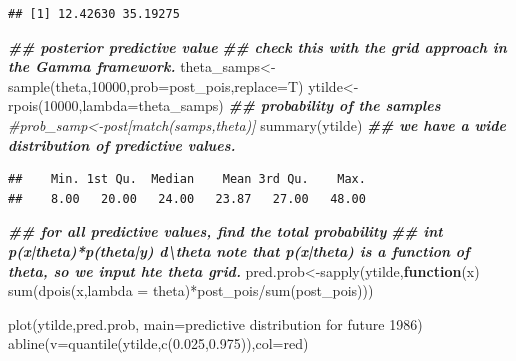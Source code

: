 \documentclass[
]{book}
\newenvironment{Shaded}{\begin{snugshade}}{\end{snugshade}}
\newcommand{\AttributeTok}[1]{\textcolor[rgb]{0.77,0.63,0.00}{#1}}
\newcommand{\CommentTok}[1]{\textcolor[rgb]{0.56,0.35,0.01}{\textit{#1}}}
\newcommand{\ControlFlowTok}[1]{\textcolor[rgb]{0.13,0.29,0.53}{\textbf{#1}}}
\newcommand{\DecValTok}[1]{\textcolor[rgb]{0.00,0.00,0.81}{#1}}
\newcommand{\DocumentationTok}[1]{\textcolor[rgb]{0.56,0.35,0.01}{\textbf{\textit{#1}}}}
\newcommand{\FloatTok}[1]{\textcolor[rgb]{0.00,0.00,0.81}{#1}}
\newcommand{\FunctionTok}[1]{\textcolor[rgb]{0.00,0.00,0.00}{#1}}
\newcommand{\NormalTok}[1]{#1}
\newcommand{\OtherTok}[1]{\textcolor[rgb]{0.56,0.35,0.01}{#1}}
\newcommand{\SpecialCharTok}[1]{\textcolor[rgb]{0.00,0.00,0.00}{#1}}
\newcommand{\StringTok}[1]{\textcolor[rgb]{0.31,0.60,0.02}{#1}}
\theoremstyle{definition}
\theoremstyle{definition}
\theoremstyle{definition}
\theoremstyle{definition}
\theoremstyle{remark}
\begin{document}
\begin{verbatim}
## [1] 12.42630 35.19275
\end{verbatim}

\begin{Shaded}
\begin{Highlighting}[]
\DocumentationTok{\#\# posterior predictive value}
   \DocumentationTok{\#\# check this with the grid approach in the Gamma framework.  }
\NormalTok{  theta\_samps}\OtherTok{\textless{}{-}}\FunctionTok{sample}\NormalTok{(theta,}\DecValTok{10000}\NormalTok{,}\AttributeTok{prob=}\NormalTok{post\_pois,}\AttributeTok{replace=}\NormalTok{T)}
\NormalTok{   ytilde}\OtherTok{\textless{}{-}}\FunctionTok{rpois}\NormalTok{(}\DecValTok{10000}\NormalTok{,}\AttributeTok{lambda=}\NormalTok{theta\_samps) }
 \DocumentationTok{\#\# probability of the samples }
 \CommentTok{\#prob\_samp\textless{}{-}post[match(samps,theta)]}
  \FunctionTok{summary}\NormalTok{(ytilde) }\DocumentationTok{\#\# we have a wide distribution of predictive values.}
\end{Highlighting}
\end{Shaded}

\begin{verbatim}
##    Min. 1st Qu.  Median    Mean 3rd Qu.    Max. 
##    8.00   20.00   24.00   23.87   27.00   48.00
\end{verbatim}

\begin{Shaded}
\begin{Highlighting}[]
\DocumentationTok{\#\# for all predictive values,  find the total probability  }
   \DocumentationTok{\#\# int p(x|theta)*p(theta|y) d\textbackslash{}theta  note that p(x|theta) is a function of theta, so we input hte theta grid.}
\NormalTok{ pred.prob}\OtherTok{\textless{}{-}}\FunctionTok{sapply}\NormalTok{(ytilde,}\ControlFlowTok{function}\NormalTok{(x) }\FunctionTok{sum}\NormalTok{(}\FunctionTok{dpois}\NormalTok{(x,}\AttributeTok{lambda =}\NormalTok{ theta)}\SpecialCharTok{*}\NormalTok{post\_pois}\SpecialCharTok{/}\FunctionTok{sum}\NormalTok{(post\_pois)))  }
  
 \FunctionTok{plot}\NormalTok{(ytilde,pred.prob, }\AttributeTok{main=}\StringTok{\textquotesingle{}predictive distribution for future 1986\textquotesingle{}}\NormalTok{)}
 \FunctionTok{abline}\NormalTok{(}\AttributeTok{v=}\FunctionTok{quantile}\NormalTok{(ytilde,}\FunctionTok{c}\NormalTok{(}\FloatTok{0.025}\NormalTok{,}\FloatTok{0.975}\NormalTok{)),}\AttributeTok{col=}\StringTok{\textquotesingle{}red\textquotesingle{}}\NormalTok{)}
\end{Highlighting}
\end{Shaded}
\end{document}

